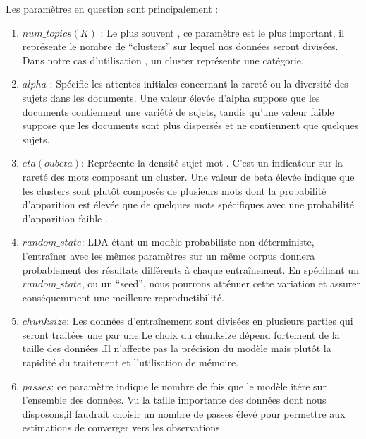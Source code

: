 \documentclass[12pt]{extarticle}
\begin{document}
Les  paramètres  en question sont principalement : \cite{4}
\begin{enumerate}
\item $num\_topics(K)$  : Le plus souvent , ce paramètre est le plus important, il représente le nombre de “clusters” sur lequel nos données seront divisées. Dans notre cas d’utilisation , un cluster représente une catégorie.
\item $alpha$ : Spécifie les attentes initiales concernant la rareté ou la diversité des sujets dans les documents. Une valeur élevée d'alpha suppose que les documents contiennent une variété de sujets, tandis qu'une valeur faible suppose que les documents sont plus dispersés et ne contiennent que quelques sujets.

\item $eta(ou beta)$:  Représente la densité sujet-mot . C’est un indicateur sur  la rareté des mots composant un cluster. Une valeur de beta élevée indique que les clusters sont  plutôt composés de plusieurs mots dont la probabilité d’apparition est élevée  que de quelques mots spécifiques avec une  probabilité d’apparition faible .
\item $random\_state$: LDA étant un modèle probabiliste non déterministe, l’entraîner avec les mêmes paramètres sur un même corpus donnera probablement  des résultats différents à chaque entraînement. En spécifiant un $random\_state$, ou un “seed”, nous pourrons atténuer cette variation et assurer conséquemment  une meilleure reproductibilité.
\item $chunksize$: Les données d’entraînement sont divisées en plusieurs parties qui seront traitées une par une.Le choix du chunksize dépend  fortement de la taille des données .Il  n’affecte pas la précision du modèle mais plutôt  la rapidité du traitement et l’utilisation de mémoire.
\item $passes$:  ce paramètre indique le nombre de fois que le modèle itére sur l’ensemble des données. Vu la taille importante  des données dont nous disposons,il faudrait choisir un nombre de passes  élevé pour permettre aux estimations de converger vers les observations.
\end{enumerate}
\end{document}
